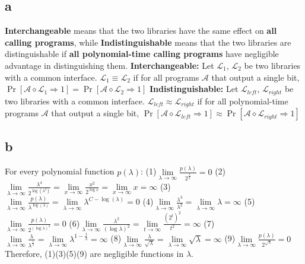 \documentclass[12pt]{article}
\begin{document}
\subsection{a}
\textbf{Interchangeable} means that the two libraries have the same effect on \textbf{all calling programs}, while \textbf{Indistinguishable} means that the two libraries are distinguishable if \textbf{all polynomial-time calling programs} have negligible advantage in distinguishing them.
\newline
\textbf{Interchangeable:} Let $\mathcal L_1$, $\mathcal L_2$ be two libraries with a common interface. $\mathcal L_1\equiv \mathcal L_2$ if for all programs $\mathcal A$ that output a single bit, $\Pr[\mathcal A\diamond \mathcal L_1\Rightarrow 1]=\Pr[\mathcal A\diamond \mathcal L_2\Rightarrow 1]$
\newline
\textbf{Indistinguishable:} Let $\mathcal L_{left}$, $\mathcal L_{right}$ be two libraries with a common interface. $\mathcal L_{left}\approx \mathcal L_{right}$ if for all polynomial-time programs $\mathcal A$ that output a single bit, $\Pr[\mathcal A\diamond \mathcal L_{left}\Rightarrow 1]\approx\Pr[\mathcal A\diamond \mathcal L_{right}\Rightarrow 1]$
\subsection{b}
For every polynomial function $p(\lambda)$:
\newline
(1)$\lim\limits_{\lambda\rightarrow\infty}\frac{p(\lambda)}{2^{\frac{\lambda}{2}}}=0$
\newline
(2)$\lim\limits_{\lambda\rightarrow\infty}\frac{\lambda^4}{2^{\log(\lambda^2)}}=\lim\limits_{x\rightarrow\infty}\frac{x^2}{2^{\log x}}=\lim\limits_{x\rightarrow\infty}x=\infty$
\newline
(3)$\lim\limits_{\lambda\rightarrow\infty}\frac{p(\lambda)}{\lambda^{\log(\lambda)}}=\lim\limits_{\lambda\rightarrow\infty}\lambda^{C-\log(\lambda)}=0$
\newline
(4)$\lim\limits_{\lambda\rightarrow\infty}\frac{\lambda^3}{\lambda^2}=\lim\limits_{\lambda\rightarrow\infty}\lambda=\infty$
\newline
(5)$\lim\limits_{\lambda\rightarrow\infty}\frac{p(\lambda)}{2^{(\log \lambda)^2}}=0$
\newline
(6)$\lim\limits_{\lambda\rightarrow\infty}\frac{\lambda^2}{(\log \lambda)^2}=\lim\limits_{t\rightarrow\infty}\frac{(2^t)^2}{t^2}=\infty$
\newline
(7)$\lim\limits_{\lambda\rightarrow\infty}\frac{\lambda}{\lambda^\frac{1}{\lambda}}=\lim\limits_{\lambda\rightarrow\infty}\lambda^{1-\frac{1}{\lambda}}=\infty$
\newline
(8)$\lim\limits_{\lambda\rightarrow\infty}\frac{\lambda}{\sqrt{\lambda}}=\lim\limits_{\lambda\rightarrow\infty}\sqrt{\lambda}=\infty$
\newline
(9)$\lim\limits_{\lambda\rightarrow\infty}\frac{p(\lambda)}{2^{\sqrt{\lambda}}}=0$
\newline
Therefore, (1)\quad (3)\quad (5)\quad (9) are negligible functions in $\lambda$.
\end{document}
